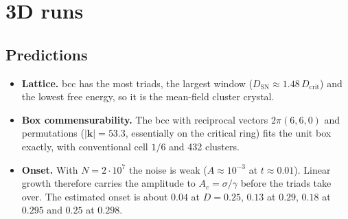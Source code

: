 \documentclass[11pt]{article}
\newcommand{\Dc}{D_{\mathrm{crit}}}
\newcommand{\Dsn}{D_{\mathrm{SN}}}
\begin{document}
\section{3D runs}

\subsection{Predictions}
\begin{itemize}
  \item \textbf{Lattice.} bcc has the most triads, the largest window
        ($\Dsn\approx1.48\,\Dc$) and the lowest free energy, so it is the
        mean-field cluster crystal.
  \item \textbf{Box commensurability.} The bcc with reciprocal vectors
        $2\pi(6,6,0)$ and permutations ($|\mathbf k|=53.3$, essentially on the
        critical ring) fits the unit box exactly, with conventional cell
        $1/6$ and 432 clusters.
  \item \textbf{Onset.} With $N=2\cdot10^7$ the noise is weak ($A\approx10^{-3}$
        at $t\approx0.01$). Linear growth therefore carries the amplitude to
        $A_c=\sigma/\gamma$ before the triads take over. The estimated onset
        is about $0.04$ at $D=0.25$, $0.13$ at $0.29$, $0.18$ at $0.295$ and
        $0.25$ at $0.298$.
\end{itemize}
\end{document}
